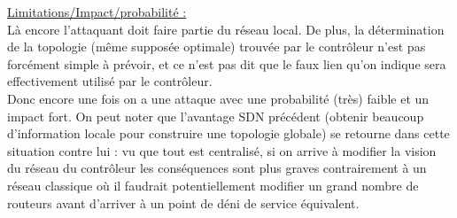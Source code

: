 \underline{Limitations/Impact/probabilité :}\\
Là encore l’attaquant doit faire partie du réseau local. De plus, la détermination de la topologie (même supposée optimale) trouvée par le contrôleur n’est pas forcément simple à prévoir, et ce n’est pas dit que le faux lien qu’on indique sera effectivement utilisé par le contrôleur.\\
Donc encore une fois on a une attaque avec une probabilité (très) faible et un impact fort. On peut noter que l’avantage SDN précédent (obtenir beaucoup d'information locale pour construire une topologie globale) se retourne dans cette situation contre lui : vu que tout est centralisé, si on arrive à modifier la vision du réseau du contrôleur les conséquences sont plus graves contrairement à un réseau classique où il faudrait potentiellement modifier un grand nombre de routeurs avant d’arriver à un point de déni de service équivalent.